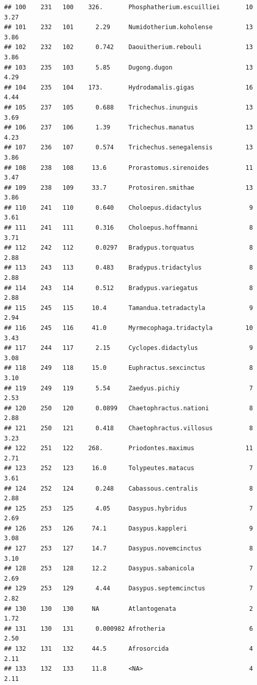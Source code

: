 \documentclass[10pt,letterpaper]{article}
\begin{document}
\begin{verbatim}
## 100    231   100    326.       Phosphatherium.escuilliei       10    3.27 
## 101    232   101      2.29     Numidotherium.koholense         13    3.86 
## 102    232   102      0.742    Daouitherium.rebouli            13    3.86 
## 103    235   103      5.85     Dugong.dugon                    13    4.29 
## 104    235   104    173.       Hydrodamalis.gigas              16    4.44 
## 105    237   105      0.688    Trichechus.inunguis             13    3.69 
## 106    237   106      1.39     Trichechus.manatus              13    4.23 
## 107    236   107      0.574    Trichechus.senegalensis         13    3.86 
## 108    238   108     13.6      Prorastomus.sirenoides          11    3.47 
## 109    238   109     33.7      Protosiren.smithae              13    3.86 
## 110    241   110      0.640    Choloepus.didactylus             9    3.61 
## 111    241   111      0.316    Choloepus.hoffmanni              8    3.71 
## 112    242   112      0.0297   Bradypus.torquatus               8    2.88 
## 113    243   113      0.483    Bradypus.tridactylus             8    2.88 
## 114    243   114      0.512    Bradypus.variegatus              8    2.88 
## 115    245   115     10.4      Tamandua.tetradactyla            9    2.94 
## 116    245   116     41.0      Myrmecophaga.tridactyla         10    3.43 
## 117    244   117      2.15     Cyclopes.didactylus              9    3.08 
## 118    249   118     15.0      Euphractus.sexcinctus            8    3.10 
## 119    249   119      5.54     Zaedyus.pichiy                   7    2.53 
## 120    250   120      0.0899   Chaetophractus.nationi           8    2.88 
## 121    250   121      0.418    Chaetophractus.villosus          8    3.23 
## 122    251   122    268.       Priodontes.maximus              11    2.71 
## 123    252   123     16.0      Tolypeutes.matacus               7    3.61 
## 124    252   124      0.248    Cabassous.centralis              8    2.88 
## 125    253   125      4.05     Dasypus.hybridus                 7    2.69 
## 126    253   126     74.1      Dasypus.kappleri                 9    3.08 
## 127    253   127     14.7      Dasypus.novemcinctus             8    3.10 
## 128    253   128     12.2      Dasypus.sabanicola               7    2.69 
## 129    253   129      4.44     Dasypus.septemcinctus            7    2.82 
## 130    130   130     NA        Atlantogenata                    2    1.72 
## 131    130   131      0.000982 Afrotheria                       6    2.50 
## 132    131   132     44.5      Afrosorcida                      4    2.11 
## 133    132   133     11.8      <NA>                             4    2.11 

\end{verbatim}
\end{document}
